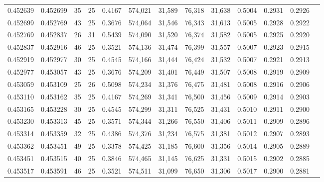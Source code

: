 \begin{tabular}{rrrrrrrrrrrrr}
0.452639 & 0.452699 &    35 &  25 &                                     0.4167 & 574,021 &  31,589 &  76,318 &  31,638 & 0.5004 & 0.2931 & 0.2926 \\
0.452699 & 0.452769 &    43 &  25 &                                     0.3676 & 574,064 &  31,546 &  76,343 &  31,613 & 0.5005 & 0.2928 & 0.2922 \\
0.452769 & 0.452837 &    26 &  31 &                                     0.5439 & 574,090 &  31,520 &  76,374 &  31,582 & 0.5005 & 0.2925 & 0.2920 \\
0.452837 & 0.452916 &    46 &  25 &                                     0.3521 & 574,136 &  31,474 &  76,399 &  31,557 & 0.5007 & 0.2923 & 0.2915 \\
0.452919 & 0.452977 &    30 &  25 &                                     0.4545 & 574,166 &  31,444 &  76,424 &  31,532 & 0.5007 & 0.2921 & 0.2913 \\
0.452977 & 0.453057 &    43 &  25 &                                     0.3676 & 574,209 &  31,401 &  76,449 &  31,507 & 0.5008 & 0.2919 & 0.2909 \\
0.453059 & 0.453109 &    25 &  26 &                                     0.5098 & 574,234 &  31,376 &  76,475 &  31,481 & 0.5008 & 0.2916 & 0.2906 \\
0.453110 & 0.453162 &    35 &  25 &                                     0.4167 & 574,269 &  31,341 &  76,500 &  31,456 & 0.5009 & 0.2914 & 0.2903 \\
0.453165 & 0.453228 &    30 &  25 &                                     0.4545 & 574,299 &  31,311 &  76,525 &  31,431 & 0.5010 & 0.2911 & 0.2900 \\
0.453230 & 0.453313 &    45 &  25 &                                     0.3571 & 574,344 &  31,266 &  76,550 &  31,406 & 0.5011 & 0.2909 & 0.2896 \\
0.453314 & 0.453359 &    32 &  25 &                                     0.4386 & 574,376 &  31,234 &  76,575 &  31,381 & 0.5012 & 0.2907 & 0.2893 \\
0.453362 & 0.453451 &    49 &  25 &                                     0.3378 & 574,425 &  31,185 &  76,600 &  31,356 & 0.5014 & 0.2905 & 0.2889 \\
0.453451 & 0.453515 &    40 &  25 &                                     0.3846 & 574,465 &  31,145 &  76,625 &  31,331 & 0.5015 & 0.2902 & 0.2885 \\
0.453517 & 0.453591 &    46 &  25 &                                     0.3521 & 574,511 &  31,099 &  76,650 &  31,306 & 0.5017 & 0.2900 & 0.2881 \\

\end{tabular}
